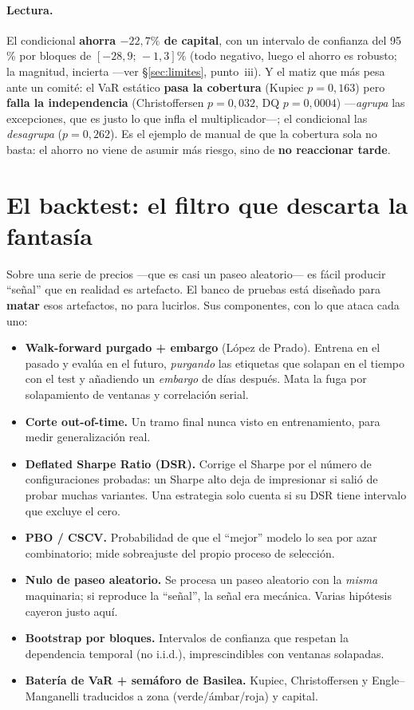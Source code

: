 \documentclass[11pt,a4paper]{article}
\begin{document}
\paragraph{Lectura.} El condicional \textbf{ahorra $-22{,}7\%$ de capital}, con un
intervalo de confianza del 95\,\% por bloques de $[-28{,}9;\,-1{,}3]\%$ (todo
negativo, luego el ahorro es robusto; la magnitud, incierta ---ver
§\ref{sec:limites}, punto~iii). Y el matiz que más pesa ante un comité: el VaR
estático \textbf{pasa la cobertura} (Kupiec $p=0{,}163$) pero \textbf{falla la
independencia} (Christoffersen $p=0{,}032$, DQ $p=0{,}0004$) ---\emph{agrupa} las
excepciones, que es justo lo que infla el multiplicador---; el condicional las
\emph{desagrupa} ($p=0{,}262$). Es el ejemplo de manual de que la cobertura sola
no basta: el ahorro no viene de asumir más riesgo, sino de \textbf{no reaccionar
tarde}.

\section{El backtest: el filtro que descarta la fantasía}\label{sec:bt}
Sobre una serie de precios ---que es casi un paseo aleatorio--- es fácil producir
``señal'' que en realidad es artefacto. El banco de pruebas está diseñado para
\textbf{matar} esos artefactos, no para lucirlos. Sus componentes, con lo que
ataca cada uno:

\begin{itemize}\itemsep2pt
\item \textbf{Walk-forward purgado + embargo} (López de Prado). Entrena en el
pasado y evalúa en el futuro, \emph{purgando} las etiquetas que solapan en el
tiempo con el test y añadiendo un \emph{embargo} de días después. Mata la fuga
por solapamiento de ventanas y correlación serial.
\item \textbf{Corte out-of-time.} Un tramo final nunca visto en entrenamiento,
para medir generalización real.
\item \textbf{Deflated Sharpe Ratio (DSR).} Corrige el Sharpe por el número de
configuraciones probadas: un Sharpe alto deja de impresionar si salió de probar
muchas variantes. Una estrategia solo cuenta si su DSR tiene intervalo que
excluye el cero.
\item \textbf{PBO / CSCV.} Probabilidad de que el ``mejor'' modelo lo sea por azar
combinatorio; mide sobreajuste del propio proceso de selección.
\item \textbf{Nulo de paseo aleatorio.} Se procesa un paseo aleatorio con la
\emph{misma} maquinaria; si reproduce la ``señal'', la señal era mecánica. Varias
hipótesis cayeron justo aquí.
\item \textbf{Bootstrap por bloques.} Intervalos de confianza que respetan la
dependencia temporal (no i.i.d.), imprescindibles con ventanas solapadas.
\item \textbf{Batería de VaR + semáforo de Basilea.} Kupiec, Christoffersen y
Engle--Manganelli traducidos a zona (verde/ámbar/roja) y capital.
\end{itemize}
\end{document}

